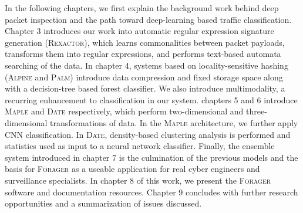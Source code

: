 In the following chapters, we first explain the background work behind deep packet inspection and the path toward deep-learning based traffic classification. Chapter 3 introduces our work into automatic regular expression signature generation (\textsc{Rexactor}), which learns commonalities between packet payloads, transforms them into regular expressions, and performs text-based automata searching of the data. In chapter 4, systems based on locality-sensitive hashing (\textsc{Alpine} and \textsc{Palm}) introduce data compression and fixed storage space along with a decision-tree based forest classifier. We also introduce multimodality, a recurring enhancement to classification in our system. chapters 5 and 6 introduce \textsc{Maple} and \textsc{Date} respectively, which perform two-dimensional and three-dimensional transformations of data. In the \textsc{Maple} architecture, we further apply CNN classification. In \textsc{Date}, density-based clustering analysis is performed and statistics used as input to a neural network classifier. Finally, the ensemble system introduced in chapter 7 is the culmination of the previous models and the basis for \textsc{Forager} as a useable application for real cyber engineers and surveillance specialists. In chapter 8 of this work, we present the \textsc{Forager} software and documentation resources. Chapter 9 concludes with further research opportunities and a summarization of issues discussed.
